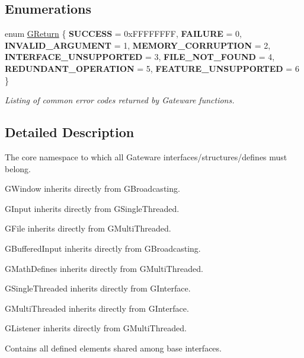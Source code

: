 \subsection*{Enumerations}
\begin{DoxyCompactItemize}
\item 
\mbox{\label{namespaceGW_a67a839e3df7ea8a5c5686613a7a3de21}} 
enum \hyperlink{namespaceGW_a67a839e3df7ea8a5c5686613a7a3de21}{G\+Return} \{ \newline
{\bfseries S\+U\+C\+C\+E\+SS} = 0x\+F\+F\+F\+F\+F\+F\+FF, 
{\bfseries F\+A\+I\+L\+U\+RE} = 0, 
{\bfseries I\+N\+V\+A\+L\+I\+D\+\_\+\+A\+R\+G\+U\+M\+E\+NT} = 1, 
{\bfseries M\+E\+M\+O\+R\+Y\+\_\+\+C\+O\+R\+R\+U\+P\+T\+I\+ON} = 2, 
\newline
{\bfseries I\+N\+T\+E\+R\+F\+A\+C\+E\+\_\+\+U\+N\+S\+U\+P\+P\+O\+R\+T\+ED} = 3, 
{\bfseries F\+I\+L\+E\+\_\+\+N\+O\+T\+\_\+\+F\+O\+U\+ND} = 4, 
{\bfseries R\+E\+D\+U\+N\+D\+A\+N\+T\+\_\+\+O\+P\+E\+R\+A\+T\+I\+ON} = 5, 
{\bfseries F\+E\+A\+T\+U\+R\+E\+\_\+\+U\+N\+S\+U\+P\+P\+O\+R\+T\+ED} = 6
 \}\begin{DoxyCompactList}\small\item\em Listing of common error codes returned by Gateware functions. \end{DoxyCompactList}
\end{DoxyCompactItemize}


\subsection{Detailed Description}
The core namespace to which all Gateware interfaces/structures/defines must belong. 

G\+Window inherits directly from G\+Broadcasting.

G\+Input inherits directly from G\+Single\+Threaded.

G\+File inherits directly from G\+Multi\+Threaded.

G\+Buffered\+Input inherits directly from G\+Broadcasting.

G\+Math\+Defines inherits directly from G\+Multi\+Threaded.

G\+Single\+Threaded inherits directly from G\+Interface.

G\+Multi\+Threaded inherits directly from G\+Interface.

G\+Listener inherits directly from G\+Multi\+Threaded.

Contains all defined elements shared among base interfaces.

